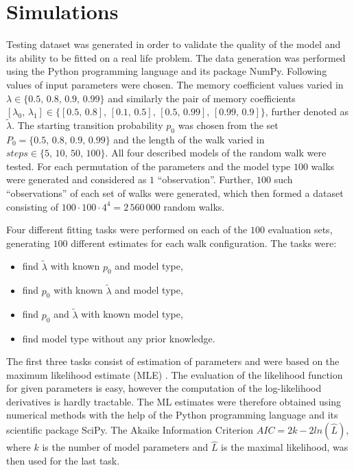 \documentclass{amsart}
\theoremstyle{definition}
\theoremstyle{plain}
\theoremstyle{plain}
\theoremstyle{plain}
\numberwithin{equation}{section}
\begin{document}
\section{Simulations\label{sec:Simulations}}

Testing dataset was generated in order to validate the quality of
the model and its ability to be fitted on a real life problem. The
data generation was performed using the Python programming language
and its package NumPy. Following values of input parameters were chosen.
The memory coefficient values varied in $\lambda\in\{0.5,\,0.8,\,0.9,\,0.99\}$
and similarly the pair of memory coefficients $[\lambda_{0},\,\lambda_{1}]\in\{[0.5,\,0.8],\,[0.1,\,0.5],\,[0.5,\,0.99],\,[0.99,\,0.9]\}$, further denoted as $\tilde{\lambda}$.
The starting transition probability $p_{0}$ was chosen from the set
$P_{0}=\{0.5,\,0.8,\,0.9,\,0.99\}$ and the length of the walk varied in
\textbf{$steps\in\{5,\,10,\,50,\,100\}$}. All four described models of the random walk were tested. For each permutation of the
parameters and the model type $100$ walks were generated and considered as $1$ ``observation''. Further, $100$ such ``observations'' of each set of walks were generated, which then formed a dataset consisting of $100\cdot100\cdot4^4=2\,560\,000$ random walks. 

Four different fitting tasks were performed on each of the $100$ {\color{red}evaluation sets}, generating $100$ different estimates for each walk configuration. The tasks were:

\begin{itemize}
\item find $\tilde{\lambda}$ with known $p_{0}$ and model type,
\item find $p_{0}$ with known $\tilde{\lambda}$ and model type,
\item find $p_{0}$ and $\tilde{\lambda}$ with known model type,
\item find model type without any prior knowledge.
\end{itemize}

The first three tasks consist of estimation of parameters and were based on the maximum likelihood estimate (MLE) \cite{rossi2018mathematical}. The evaluation of the likelihood function for given parameters is easy, however the computation of the log-likelihood derivatives is hardly tractable. The ML estimates were therefore obtained using numerical methods with the help of the Python programming language and its scientific package SciPy. The Akaike Information Criterion $AIC=2k-2ln(\hat{L})$, where $k$ is the number of model parameters and $\hat{L}$ is the maximal likelihood, was then used for the last task.
\end{document}
